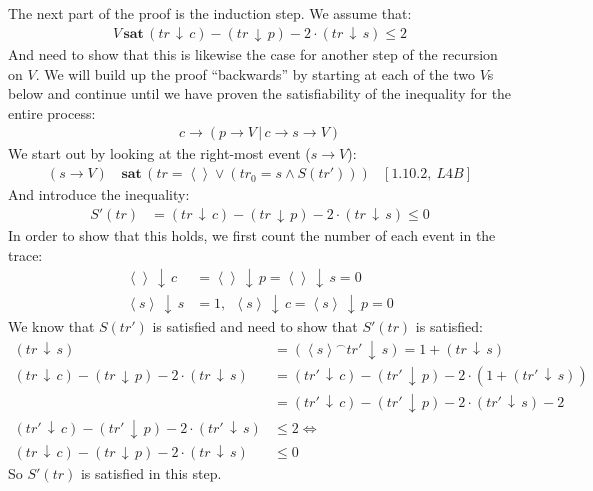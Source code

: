 \documentclass[11pt,a4paper]{article}
\def\ra{\rightarrow}
\def\ch{\,|\,}
\def\cat{^{\frown}}
\def\count{\,\downarrow\,}
\def\sat{\,\textbf{sat}\,}
\newcommand{\ab}[1]{\left \langle #1 \right \rangle}
\begin{document}
The next part of the proof is the induction step. We assume that:
\begin{align*}
    V \sat (tr \count c) - (tr \count p) - 2 \cdot (tr \count s) \leq 2 
\end{align*}
And need to show that this is likewise the case for another step of the
recursion on $V$. We will build up the proof ``backwards'' by starting at each
of the two $V$s below and continue until we have proven the satisfiability of
the inequality for the entire process:
\begin{align*}
    c \ra (p \ra V \ch c \ra s \ra V)
\end{align*}
We start out by looking at the right-most event ($s \ra V$):
\begin{align*}
    (s \ra V) &\sat (tr = \ab{ } \lor (tr_0 = s \land S(tr'))) & [1.10.2,~L4B]
\end{align*}
And introduce the inequality:
\begin{align*}
    S'(tr) &= (tr \count c) - (tr \count p) - 2 \cdot (tr \count s) \leq 0
\end{align*}
In order to show that this holds, we first count the number of each event in the
trace:
\begin{align*}
    \ab{} \count c &= \ab{} \count p = \ab{} \count s = 0 \\
    \ab{s} \count s &= 1,~~ \ab{s} \count c = \ab{s} \count p = 0
\end{align*}
We know that $S(tr')$ is satisfied and need to show that $S'(tr)$ is satisfied: 
\begin{align*}
    (tr \count s) &= (\ab{s} \cat tr' \count s) = 1 + (tr \count s) \\
    (tr \count c) - (tr \count p) - 2 \cdot (tr \count s) &=
        (tr' \count c) - (tr' \count p) - 2 \cdot (1+(tr' \count s))\\
        &= (tr' \count c) - (tr' \count p) - 2 \cdot (tr' \count s)-2\\
    (tr' \count c) - (tr' \count p) - 2 \cdot (tr' \count s) &\leq 2
        \Leftrightarrow \\
        (tr \count c) - (tr \count p) - 2 \cdot (tr \count s) &\leq 0
\end{align*}
So $S'(tr)$ is satisfied in this step.
\end{document}
